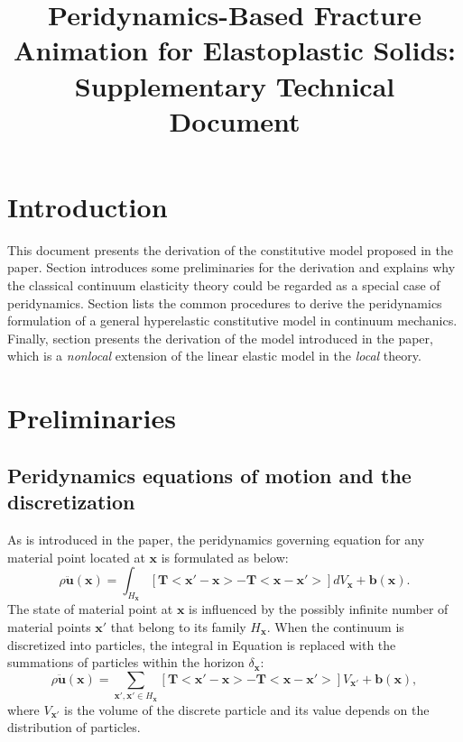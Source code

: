 \documentclass[11pt,fullpage]{article}
\title{Peridynamics-Based Fracture Animation for Elastoplastic Solids:\\
      Supplementary Technical Document}
\newcommand{\mb}[1]{\mathbf{#1}}
\newcommand{\blue}[1]{{\color{blue}{{#1}}}}
\begin{document}
\maketitle

\section{Introduction}

This document presents the derivation of the constitutive model proposed in the paper. Section \blue{\ref{section:2}} introduces some preliminaries for the derivation and explains why the classical continuum elasticity theory could be regarded as a special case of peridynamics. Section \blue{\ref{section:3}} lists the common procedures to derive the peridynamics formulation of a general hyperelastic constitutive model in continuum mechanics. Finally, section \blue{\ref{section:4}} presents the derivation of the model introduced in the paper, which is a \emph{nonlocal} extension of the linear elastic model in the \emph{local} theory.

\section{Preliminaries}\label{section:2}

\subsection{Peridynamics equations of motion and the discretization}

As is introduced in the paper, the peridynamics governing equation for any material point located at $\mb{x}$ is formulated as below:
\begin{equation}
\rho\ddot{\mb{u}}(\mb{x}) = \int_{H_\mb{x}}[\mb{T}<\mb{x}'-\mb{x}> - \mb{T}<\mb{x}-\mb{x}'>]dV_{\mb{x}}+\mb{b}(\mb{x}).
\label{eq:1}
\end{equation}
The state of material point at $\mb{x}$ is influenced by the possibly infinite number of material points $\mb{x}'$ that belong to its family $H_\mb{x}$. When the continuum is discretized into particles, the integral in Equation \blue{\ref{eq:1}} is replaced with the summations of particles within the horizon $\delta_\mb{x}$:
\begin{equation}
\rho\ddot{\mb{u}}(\mb{x}) = \sum_{\mb{x}',\mb{x}'\in H_\mb{x}}[\mb{T}<\mb{x}'-\mb{x}> - \mb{T}<\mb{x}-\mb{x}'>]V_{\mb{x}'}+\mb{b}(\mb{x}),
\label{eq:2}
\end{equation}
where $V_{\mb{x}'}$ is the volume of the discrete particle and its value depends on the distribution of particles.
\end{document}
